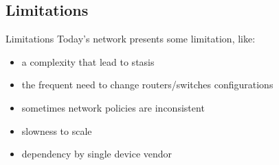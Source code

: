 \subsection{Limitations}
\begin{frame}{Limitations}
Today's network presents some limitation, like:
\begin{itemize}
\item<2-> a complexity that lead to stasis
\item<3-> the frequent need to change routers/switches configurations
\item<4-> sometimes network policies are inconsistent
\item<5-> slowness to scale
\item<6-> dependency by single device vendor
\end{itemize}
\end{frame}